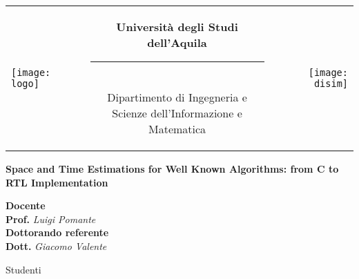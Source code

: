 \begin{titlepage}
\begin{center}
\normalsize

\begin{center}

\begin{tabular}[t]{@{} l @{} c @{} r @{}}
\parbox[c]{0.15\textwidth}{\raggedright \texttt{[image: logo]}}
&
\parbox[c]{0.7\textwidth}
{
\centering \bfseries
Università degli Studi dell'Aquila \\[-5pt]
\rule{0.6\textwidth}{1pt} \\
{\centering \small Dipartimento di Ingegneria e \\Scienze dell'Informazione e Matematica} \\
}
&
\parbox[c]{0.15\textwidth}{\raggedleft \texttt{[image: disim]}}
\end{tabular}
\end{center}

\bigskip \bigskip



\bigskip
\bigskip
\bigskip

\vfil

{\bfseries \huge
Space and Time Estimations for Well Known Algorithms: from C to RTL Implementation \\
}

{\large
\bigskip
\bigskip
\bigskip
\bigskip
{\bfseries \large Docente \\ }
\smallskip
\textbf{Prof.} \textit{Luigi Pomante} \\
\bigskip
{\bfseries \large Dottorando referente \\ }
\smallskip
\textbf{Dott.} \textit{Giacomo Valente} \\
}

{\bfseries \large
\bigskip
\bigskip


Studenti \\
}

\vfil
\vfil

\end{center}
\end{titlepage}
